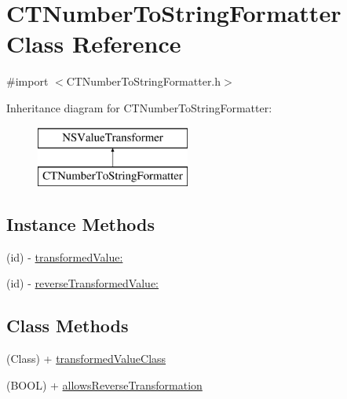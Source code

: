\hypertarget{interface_c_t_number_to_string_formatter}{\section{C\-T\-Number\-To\-String\-Formatter Class Reference}
\label{interface_c_t_number_to_string_formatter}
}


{\ttfamily \#import $<$C\-T\-Number\-To\-String\-Formatter.\-h$>$}

Inheritance diagram for C\-T\-Number\-To\-String\-Formatter\-:\begin{figure}[H]
\begin{center}
\leavevmode
\includegraphics[height=2.000000cm]{interface_c_t_number_to_string_formatter}
\end{center}
\end{figure}
\subsection*{Instance Methods}
\begin{DoxyCompactItemize}
\item 
(id) -\/ \hyperlink{interface_c_t_number_to_string_formatter_a9d2e35f8862621f17a2a24006ab4e8b2}{transformed\-Value\-:}
\item 
(id) -\/ \hyperlink{interface_c_t_number_to_string_formatter_a2e18efc8fb4819f52cd335299229deb3}{reverse\-Transformed\-Value\-:}
\end{DoxyCompactItemize}
\subsection*{Class Methods}
\begin{DoxyCompactItemize}
\item 
(Class) + \hyperlink{interface_c_t_number_to_string_formatter_a2b8f857a79feecc7b108054619d641dc}{transformed\-Value\-Class}
\item 
(B\-O\-O\-L) + \hyperlink{interface_c_t_number_to_string_formatter_a59aa7be7f9270cf40a8e01bd21183520}{allows\-Reverse\-Transformation}
\end{DoxyCompactItemize}


